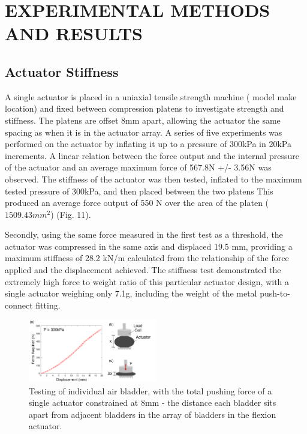 \documentclass[letterpaper, 10 pt, conference]{ieeeconf}  %
\begin{document}
\section{EXPERIMENTAL METHODS AND RESULTS}

\subsection{Actuator Stiffness}

A single actuator is placed in a uniaxial tensile strength machine ( model make location) and fixed between compression platens to investigate strength and stiffness.  The platens are offset 8mm apart, allowing the actuator the same spacing as when it is in the actuator array.  A series of five experiments was performed on the actuator by inflating it up to a pressure of 300kPa in 20kPa increments. A linear relation between the force output and the internal pressure of the actuator and an average maximum force of 567.8N +/- 3.56N was observed. The stiffness of the actuator was then tested, inflated to the maximum tested pressure of 300kPa,  and then placed between the two platens  This produced an average force output of 550 N over the area of the platen ($1509.43mm^2$) (Fig. 11).  

Secondly, using the same force measured in the first test as a threshold, the actuator was compressed in the same axis and displaced 19.5 mm, providing a maximum stiffness of 28.2 kN/m calculated from the relationship of the force applied and the displacement achieved. The stiffness test demonstrated the extremely high force to weight ratio of this particular actuator design, with a single actuator weighing only 7.1g, including the weight of the metal push-to-connect fitting. 


\begin{figure}[t!]
\centering
\includegraphics[width=0.5\textwidth]{stiiffnesstest.PNG}
\caption{Testing of individual air bladder, with the total pushing force of a single actuator constrained at 8mm - the distance each bladder sits apart from adjacent bladders in the array of bladders in the flexion actuator.}
\label{fig:stifftest}
\end{figure}
\end{document}
